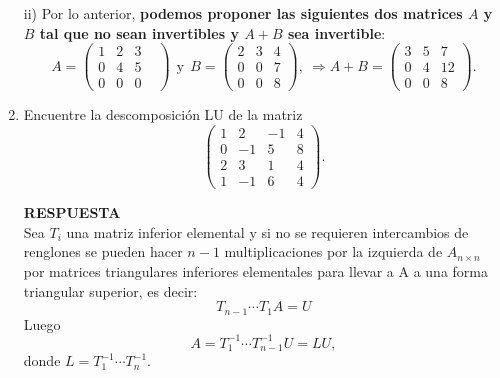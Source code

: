 \documentclass[11pt,letterpaper]{article}
\newcommand{\res}{\textbf{RESPUESTA}\\}
\begin{document}
\begin{enumerate}
ii) Por lo anterior, \textbf{podemos proponer las siguientes dos matrices $A$ y $B$ tal que no sean invertibles y $A+B$ sea invertible}:
$$A=\begin{pmatrix}
1&2&3\\
0&4&5&\\
0&0&0
\end{pmatrix} \ \ \text{y}\ \ B=\begin{pmatrix}
2&3&4\\
0&0&7\\
0&0&8
\end{pmatrix}, \ \Rightarrow A+B=\begin{pmatrix}
3&5&7\\
0&4&12\\
0&0&8
\end{pmatrix}.$$
\item Encuentre la descomposición LU de la matriz
\begin{equation*}
\left(\begin{array}{rrrr}
 1 &  2 & -1 & 4\\
 0 & -1 &  5 & 8\\
 2 &  3 &  1 & 4\\
 1 & -1 &  6 & 4
\end{array} \right).
\end{equation*}

\res Sea $T_i$  una matriz inferior elemental y si no se requieren intercambios de renglones se pueden hacer $n-1$
multiplicaciones por la izquierda de $A_{n\times n}$ por matrices triangulares inferiores elementales para llevar a A a una forma triangular superior, es decir:
$$T_{n-1} \cdots T_1 A=U$$ 
Luego 
$$A=T^{-1}_1\cdots T^{-1}_{n-1}U=LU,$$
donde $L=T^{-1}_1\cdots T^{-1}_n$.\\


\end{enumerate}
\end{document}

